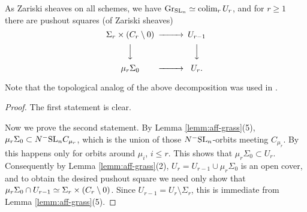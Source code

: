 \documentclass{amsart}
\numberwithin{proposition}{section}
\numberwithin{equation}{section}
\newcommand{\Gr}[1]{{\mathrm{Gr}_{#1}}}
\begin{document}
\begin{lemma} \label{lemm:aff-grass-cells}
As Zariski sheaves on all schemes, we have $\Gr{\SL_n} \wequi \colim_r U_r$, and for $r\ge1$ there are pushout squares (of Zariski sheaves)
\begin{equation*}
\begin{CD}
\Sigma_r \times (C_r \setminus 0) @>>> U_{r-1} \\
@VVV         @VVV \\
\mu_r \Sigma_0 @>>> U_r.
\end{CD}
\end{equation*}
\end{lemma}
Note that the topological analog of the above decomposition was used in \cite[Proof of (8.6.6)]{pressley1984loop}.
\begin{proof}
The first statement is clear.

Now we prove the second statement.
By Lemma \ref{lemm:aff-grass}(5), $\mu_r \Sigma_0 \subset N^-\mathrm{SL}_n C_{\mu_r}$, which is the union of those $N^-\mathrm{SL}_n$-orbits meeting $C_{\mu_r}$.
By \cite[p. 48]{faltings-loop-groups} this happens only for orbits around $\mu_i$, $i \le r$.
This shows that $\mu_r \Sigma_0 \subset U_r$.
Consequently by Lemma \ref{lemm:aff-grass}(2), $U_r = U_{r-1} \cup \mu_r \Sigma_0$ is an open cover, and to obtain the desired pushout square we need only show that $\mu_r \Sigma_0 \cap U_{r-1} \simeq \Sigma_r \times (C_r \setminus 0)$.
Since $U_{r-1} = U_r \setminus \Sigma_r$, this is immediate from Lemma \ref{lemm:aff-grass}(5).
\end{proof}
\end{document}
